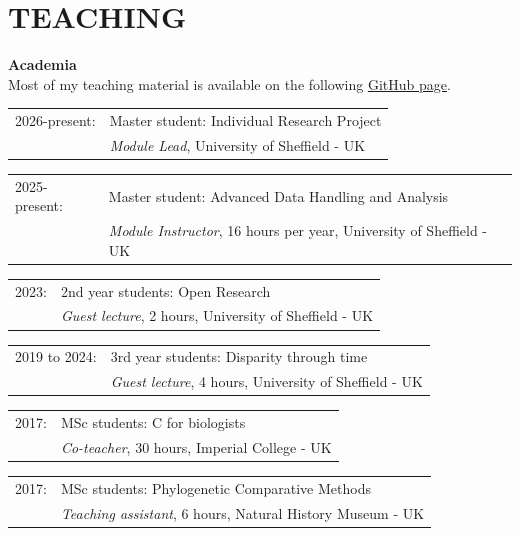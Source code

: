 \documentclass[10pt,a4paper]{article}
\begin{document}
{\section{TEACHING}
\bigskip

\raggedright\textbf{Academia}\\[1.5ex]
Most of my teaching material is available on the following \href{https://github.com/TGuillermeTeaching}{GitHub page}.

\begin{tabular}{ll}
2026-present: & Master student: Individual Research Project \\
      & \textit{Module Lead}, University of Sheffield - UK \\
\end{tabular}

\begin{tabular}{ll}
2025-present: & Master student: Advanced Data Handling and Analysis \\
      & \textit{Module Instructor}, 16 hours per year, University of Sheffield - UK \\
\end{tabular}

\begin{tabular}{ll}
2023: & 2nd year students: Open Research\\
      & \textit{Guest lecture}, 2 hours, University of Sheffield - UK \\
\end{tabular}

\begin{tabular}{ll}
2019 to 2024: & 3rd year students: Disparity through time\\
           & \textit{Guest lecture}, 4 hours, University of Sheffield - UK \\
\end{tabular}

\begin{tabular}{ll}
2017: & MSc students: C for biologists\\
      & \textit{Co-teacher}, 30 hours, Imperial College - UK \\
\end{tabular}

\begin{tabular}{ll}
2017: & MSc students: Phylogenetic Comparative Methods\\
      & \textit{Teaching assistant}, 6 hours, Natural History Museum - UK \\
\end{tabular}

}
\end{document}
